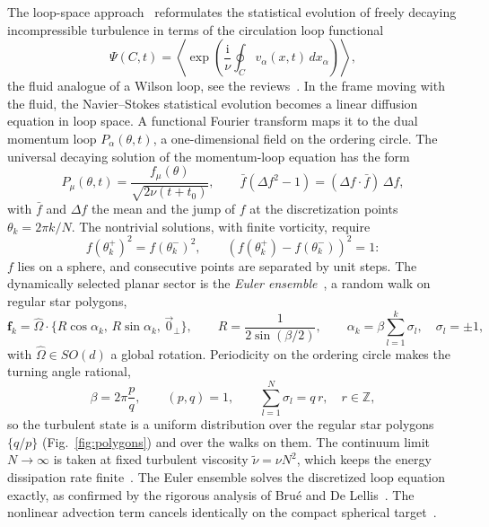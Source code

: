 \documentclass[aip,pof,preprint,floatfix,nofootinbib,amsmath,amssymb]{revtex4-2}
\def\I{\mathrm{i}}
\def\VEV#1{\left\langle #1 \right\rangle}
\newcommand{\vect}[1]{\boldsymbol{#1}}
\begin{document}
The loop-space approach~\cite{M93, migdal2023exact, migdal2024quantum} reformulates the statistical evolution of freely
decaying incompressible turbulence in terms of the circulation loop functional
\begin{equation}
    \Psi(C,t)=\VEV{\exp\left(\frac{\I}{\nu}\oint_{C}v_\alpha(x,t)\,dx_\alpha\right)},
    \label{eq:Psi}
\end{equation}
the fluid analogue of a Wilson loop, see the reviews~\cite{ReviewPaperAM, migdal2026Riemann}. In the frame moving with the fluid,
the Navier--Stokes statistical evolution becomes a linear diffusion equation in loop space. A functional Fourier transform
maps it to the dual momentum loop $P_\alpha(\theta,t)$, a one-dimensional field on the ordering circle. The universal decaying
solution of the momentum-loop equation has the form
\begin{equation}
    P_\mu(\theta,t)=\frac{f_\mu(\theta)}{\sqrt{2\nu(t+t_0)}},\qquad
    \bar f\left(\Delta f^2-1\right)=(\Delta f\cdot\bar f)\,\Delta f ,
    \label{eq:Psol}
\end{equation}
with $\bar f$ and $\Delta f$ the mean and the jump of $f$ at the discretization points $\theta_k=2\pi k/N$. The nontrivial
solutions, with finite vorticity, require
\begin{equation}
    f(\theta_k^+)^2=f(\theta_k^-)^2,\qquad \left(f(\theta_k^+)-f(\theta_k^-)\right)^2=1 :
\end{equation}
$f$ lies on a sphere, and consecutive points are separated by unit steps. The dynamically selected planar sector is the
\emph{Euler ensemble}~\cite{migdal2023exact, migdal2024quantum, migdal2026Riemann}, a random walk on regular star polygons,
\begin{equation}
    \vect f_k=\hat\Omega\cdot\{R\cos\alpha_k,\,R\sin\alpha_k,\,\vec 0_\perp\},\qquad
    R=\frac{1}{2\sin(\beta/2)},\qquad
    \alpha_k=\beta\sum_{l=1}^{k}\sigma_l,\quad\sigma_l=\pm1,
    \label{eq:EulerEnsemble}
\end{equation}
with $\hat\Omega\in SO(d)$ a global rotation. Periodicity on the ordering circle makes the turning angle rational,
\begin{equation}
    \beta=2\pi\frac{p}{q},\qquad (p,q)=1,\qquad \sum_{l=1}^{N}\sigma_l=q\,r,\quad r\in\mathbb Z ,
\end{equation}
so the turbulent state is a uniform distribution over the regular star polygons $\{q/p\}$ (Fig.~\ref{fig:polygons}) and over
the walks on them. The continuum limit $N\to\infty$ is taken at fixed turbulent viscosity $\tilde\nu=\nu N^2$, which keeps the
energy dissipation rate finite~\cite{migdal2023exact, ReviewPaperAM}. The Euler ensemble solves the discretized loop equation
exactly, as confirmed by the rigorous analysis of Bru\'e and De Lellis~\cite{DeLellisInprep}. The nonlinear advection term
cancels identically on the compact spherical target~\cite{migdal2026Riemann}.
\end{document}
